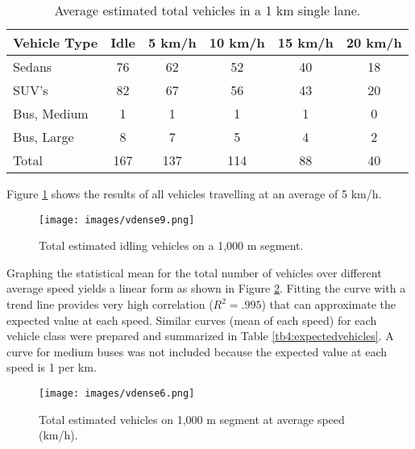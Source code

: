 \documentclass[preprint,12pt,a4paper]{elsarticle}
\begin{document}
\begin{linenumbers}
\begin{table}[H]
\centering
\caption{Average estimated total vehicles in a 1 km single lane.}
\label{tab:meanvehdensity}
\begin{tabular}{@{}lccccc@{}}
\toprule
\textbf{Vehicle Type} & \textbf{Idle} & \textbf{5 km/h} & \textbf{10 km/h} & \textbf{15 km/h} & \textbf{20 km/h} \\ \midrule
Sedans & 76 & 62 & 52 & 40 & 18 \\
SUV's & 82 & 67 & 56 & 43 & 20 \\
Bus, Medium & 1 & 1 & 1 & 1 & 0 \\
Bus, Large & 8 & 7 & 5 & 4 & 2 \\
Total & 167 & 137 & 114 & 88 & 40 \\ \bottomrule
\end{tabular}
\end{table}

Figure \ref{fig6:estimatedobs} shows the results of all vehicles travelling at an average of 5 km/h.
 
%
\begin{figure}[H]
\texttt{[image: images/vdense9.png]} 
\caption{Total estimated idling vehicles on a 1,000 m segment.}
\label{fig6:estimatedobs}
\end{figure}
%

Graphing the statistical mean for the total number of vehicles over different average speed yields a linear form as shown in Figure \ref{fig9:estimateavemix}.  Fitting the curve with a trend line provides very high correlation ($R^{2} = .995$) that can approximate the expected value at each speed.  Similar curves (mean of each speed) for each vehicle class were prepared and summarized in Table \ref{tb4:expectedvehicles}.  A curve for medium buses was not included because the expected value at each speed is 1 per km.

%
\begin{figure}[H]
\texttt{[image: images/vdense6.png]}
\caption{Total estimated vehicles on 1,000 m segment at average speed (km/h).}
\label{fig9:estimateavemix}
\end{figure}
% 


\end{linenumbers}
\end{document}
